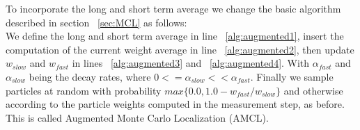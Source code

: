\documentclass[	DIV=calc,%
							paper=a4,%
							fontsize=9pt,%
							twocolumn]{scrartcl}	 					%
\begin{document}
To incorporate the long and short term average we change the basic algorithm described in section ~\ref{sec:MCL} as follows:\\
We define the long and short term average in line ~\ref{alg:augmented1}, insert the computation of the current weight average in line ~\ref{alg:augmented2}, then update $w_{slow}$ and $w_{fast}$ in lines ~\ref{alg:augmented3} and ~\ref{alg:augmented4}. With $\alpha_{fast}$ and $\alpha_{slow}$ being the decay rates, where $0<=\alpha_{slow}<<\alpha_{fast}$. Finally we sample particles at random with probability $max\{0.0,1.0-w_{fast}/w_{slow}\}$ and otherwise according to the particle weights computed in the measurement step, as before.
This is called Augmented Monte Carlo Localization (AMCL).
\end{document}
